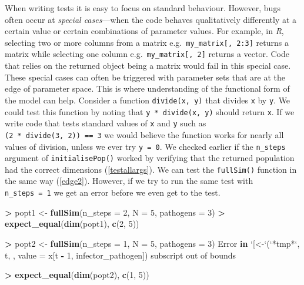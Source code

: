\documentclass[]{elsarticle} %
\newenvironment{Shaded}{\begin{snugshade}}{\end{snugshade}}
\newcommand{\ControlFlowTok}[1]{\textcolor[rgb]{0.13,0.29,0.53}{\textbf{#1}}}
\newcommand{\DataTypeTok}[1]{\textcolor[rgb]{0.13,0.29,0.53}{#1}}
\newcommand{\DecValTok}[1]{\textcolor[rgb]{0.00,0.00,0.81}{#1}}
\newcommand{\KeywordTok}[1]{\textcolor[rgb]{0.13,0.29,0.53}{\textbf{#1}}}
\newcommand{\NormalTok}[1]{#1}
\newcommand{\OperatorTok}[1]{\textcolor[rgb]{0.81,0.36,0.00}{\textbf{#1}}}
\newcommand{\StringTok}[1]{\textcolor[rgb]{0.31,0.60,0.02}{#1}}
\begin{document}
When writing tests it is easy to focus on standard behaviour.
However, bugs often occur at \emph{special cases}---when the code behaves qualitatively differently at a certain value or certain combinations of parameter values.
For example, in \emph{R}, selecting two or more columns from a matrix e.g.~\texttt{my\_matrix{[},\ 2:3{]}} returns a matrix while selecting one column e.g.~\texttt{my\_matrix{[},\ 2{]}} returns a vector.
Code that relies on the returned object being a matrix would fail in this special case.
These special cases can often be triggered with parameter sets that are at the edge of parameter space.
This is where understanding of the functional form of the model can help.
Consider a function \texttt{divide(x,\ y)} that divides \texttt{x} by \texttt{y}.
We could test this function by noting that \texttt{y\ *\ divide(x,\ y)} should return \texttt{x}.
If we write code that tests standard values of \texttt{x} and \texttt{y} such as \texttt{(2\ *\ divide(3,\ 2))\ ==\ 3} we would believe the function works for nearly all values of division, unless we ever try \texttt{y\ =\ 0}.
\newline
\newline
We checked earlier if the \texttt{n\_steps} argument of \texttt{initialisePop()} worked by verifying that the returned population had the correct dimensions (\ref{testallargs}).
We can test the \texttt{fullSim()} function in the same way (\ref{edge2}).
However, if we try to run the same test with \texttt{n\_steps\ =\ 1} we get an error before we even get to the test.
\newline
{}\label{edge2}

\begin{Shaded}
\begin{Highlighting}[]
\OperatorTok{>}\StringTok{ }\NormalTok{popt1 <-}\StringTok{ }\KeywordTok{fullSim}\NormalTok{(}\DataTypeTok{n_steps =} \DecValTok{2}\NormalTok{, }\DataTypeTok{N =} \DecValTok{5}\NormalTok{, }\DataTypeTok{pathogens =} \DecValTok{3}\NormalTok{) }
\OperatorTok{>}\StringTok{ }\KeywordTok{expect_equal}\NormalTok{(}\KeywordTok{dim}\NormalTok{(popt1), }\KeywordTok{c}\NormalTok{(}\DecValTok{2}\NormalTok{, }\DecValTok{5}\NormalTok{))}

\OperatorTok{>}\StringTok{ }\NormalTok{popt2 <-}\StringTok{ }\KeywordTok{fullSim}\NormalTok{(}\DataTypeTok{n_steps =} \DecValTok{1}\NormalTok{, }\DataTypeTok{N =} \DecValTok{5}\NormalTok{, }\DataTypeTok{pathogens =} \DecValTok{3}\NormalTok{)}
\NormalTok{Error }\ControlFlowTok{in} \StringTok{`}\DataTypeTok{[<-}\StringTok{`}\NormalTok{(}\StringTok{`}\DataTypeTok{*tmp*}\StringTok{`}\NormalTok{, t, , }\DataTypeTok{value =}\NormalTok{ x[t }\OperatorTok{-}\StringTok{ }\DecValTok{1}\NormalTok{, infector_pathogen]) }
\NormalTok{  subscript out of bounds}
  
\OperatorTok{>}\StringTok{ }\KeywordTok{expect_equal}\NormalTok{(}\KeywordTok{dim}\NormalTok{(popt2), }\KeywordTok{c}\NormalTok{(}\DecValTok{1}\NormalTok{, }\DecValTok{5}\NormalTok{))}
\end{Highlighting}
\end{Shaded}
\end{document}
